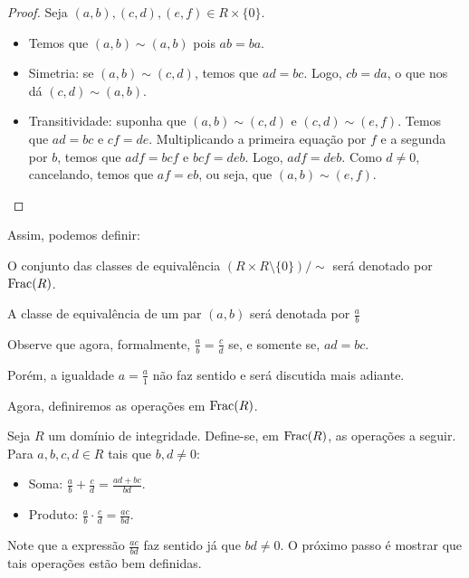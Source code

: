 \begin{proof}
    Seja $(a, b), (c, d), (e, f) \in R\times \{0\}$.
    \begin{itemize}
        \item Temos que $(a, b)\sim (a, b)$ pois $ab=ba$.
        \item Simetria: se $(a, b)\sim (c, d)$, temos que $ad=bc$.
        Logo, $cb=da$, o que nos dá $(c, d)\sim (a, b)$.
        \item Transitividade: suponha que $(a, b)\sim (c, d)$ e $(c, d)\sim (e, f)$.
        Temos que $ad=bc$ e $cf=de$.
        Multiplicando a primeira equação por $f$ e a segunda por $b$, temos que $adf=bcf$ e $bcf=deb$.
        Logo, $adf=deb$.
        Como $d\neq 0$, cancelando, temos que $af=eb$, ou seja, que $(a, b)\sim (e, f)$.
    \end{itemize}
\end{proof}
Assim, podemos definir:

\begin{definition}
    O conjunto das classes de equivalência $(R\times R\setminus\{0\})/\sim$ será denotado por $\operatorname{Frac}(R)$.
    
    A classe de equivalência de um par $(a, b)$ será denotada por $\frac{a}{b}$
\end{definition}

Observe que agora, formalmente, $\frac{a}{b}=\frac{c}{d}$ se, e somente se, $ad=bc$.

Porém, a igualdade $a=\frac{a}{1}$ não faz sentido e será discutida mais adiante.

Agora, definiremos as operações em $\operatorname{Frac}(R)$.

\begin{definition}
    Seja $R$ um domínio de integridade. Define-se, em $\operatorname{Frac}(R)$, as operações a seguir. Para $a, b, c, d \in R$ tais que $b, d\neq 0$:
    \begin{itemize}
        \item Soma: $\displaystyle\frac{a}{b}+\frac{c}{d}=\frac{ad+bc}{bd}$.
        \item Produto: $\displaystyle\frac{a}{b}\cdot\frac{c}{d}=\frac{ac}{bd}$.
    \end{itemize}
\end{definition}

Note que a expressão $\frac{ac}{bd}$ faz sentido já que $bd\neq 0$.
O próximo passo é mostrar que tais operações estão bem definidas.

